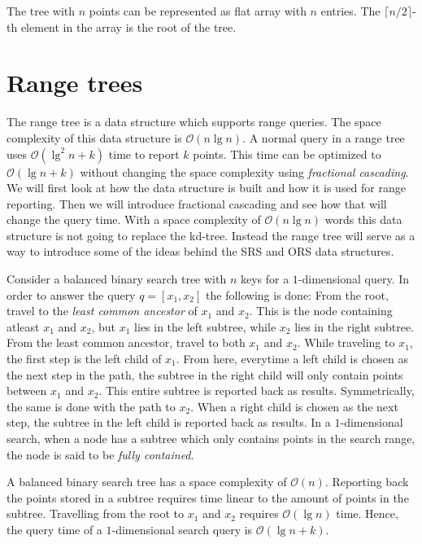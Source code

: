 The tree with $n$ points can be represented as flat array with $n$ entries. The $\lceil n/2 \rceil$-th element in the array is the root of the tree. 

\section{Range trees}
\label{sect:rangetrees}

The range tree is a data structure which supports range queries. The space complexity of this data structure is $\mathcal{O}(n\lg n)$. A normal query in a range tree uses $\mathcal{O}(\lg^2 n + k)$ time to report $k$ points. This time can be optimized to $\mathcal{O}(\lg n + k)$ without changing the space complexity using \emph{fractional cascading}. We will first look at how the data structure is built and how it is used for range reporting. Then we will introduce fractional cascading and see how that will change the query time. With a space complexity of $\mathcal{O}(n \lg n)$ words this data structure is not going to replace the kd-tree. Instead the range tree will serve as a way to introduce some of the ideas behind the SRS and ORS data structures. 

Consider a balanced binary search tree with $n$ keys for a $1$-dimensional query. In order to answer the query $q = [x_1, x_2]$ the following is done: From the root, travel to the \emph{least common ancestor} of $x_1$ and $x_2$. This is the node containing atleast $x_1$ and $x_2$, but $x_1$ lies in the left subtree, while $x_2$ lies in the right subtree. From the least common ancestor, travel to both $x_1$ and $x_2$. While traveling to $x_1$, the first step is the left child of $x_1$. From here, everytime a left child is chosen as the next step in the path, the subtree in the right child will only contain points between $x_1$ and $x_2$. This entire subtree is reported back as results. Symmetrically, the same is done with the path to $x_2$. When a right child is chosen as the next step, the subtree in the left child is reported back as results. In a $1$-dimensional search, when a node has a subtree which only contains points in the search range, the node is said to be \emph{fully contained}.

A balanced binary search tree has a space complexity of $\mathcal{O}(n)$. Reporting back the points stored in a subtree requires time linear to the amount of points in the subtree. Travelling from the root to $x_1$ and $x_2$ requires $\mathcal{O}(\lg n)$ time. Hence, the query time of a $1$-dimensional search query is $\mathcal{O}(\lg n + k)$.

